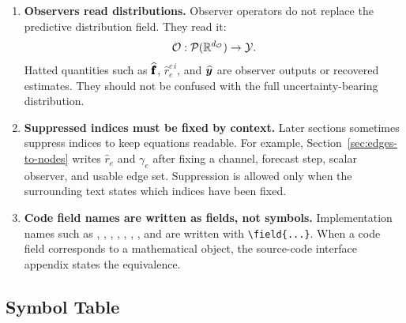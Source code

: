 \begin{enumerate}
  \item \textbf{Observers read distributions.}
  Observer operators do not replace the predictive distribution field.  They
  read it:
  \[
    \mathcal{O}
    :
    \mathcal{P}(\mathbb{R}^{d_{\mathcal{O}}})
    \rightarrow
    \mathcal{Y}.
  \]
  Hatted quantities such as $\widehat{\pmb{\mathbf{f}}}$, $\widehat{r}_{e}^{c\,i}$,
  and $\widehat{\bm{y}}$ are observer outputs or recovered estimates.  They
  should not be confused with the full uncertainty-bearing distribution.

  \item \textbf{Suppressed indices must be fixed by context.}
  Later sections sometimes suppress indices to keep equations readable.  For
  example, Section~\ref{sec:edges-to-nodes} writes $\widehat{r}_e$ and
  $\gamma_e$ after fixing a channel, forecast step, scalar observer, and usable
  edge set.  Suppression is allowed only when the surrounding text states which
  indices have been fixed.

  \item \textbf{Code field names are written as fields, not symbols.}
  Implementation names such as , ,
  , , , ,
  , and  are written with \verb|\field{...}|.  When a
  code field corresponds to a mathematical object, the source-code interface
  appendix states the equivalence.
\end{enumerate}


\subsection{Symbol Table}
\label{subsec:symbol-table}

